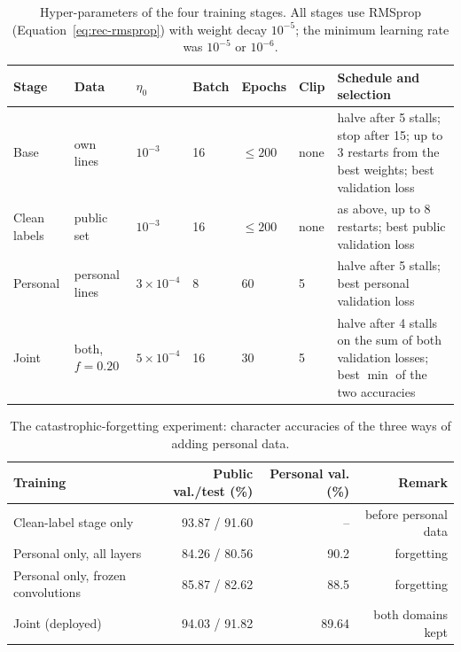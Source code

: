 \begin{table}[h]
\centering
\fontsize{9.5}{11.5}\selectfont
\begin{tabularx}{\linewidth}{|l|l|l|l|l|l|X|}
\hline
\textbf{Stage} & \textbf{Data} & \textbf{$\eta_0$} & \textbf{Batch} & \textbf{Epochs} & \textbf{Clip} & \textbf{Schedule and selection} \\
\hline
Base & own lines & $10^{-3}$ & 16 & $\le200$ & none & halve after 5 stalls; stop after 15; up to 3 restarts from the best weights; best validation loss \\
\hline
Clean labels & public set & $10^{-3}$ & 16 & $\le200$ & none & as above, up to 8 restarts; best public validation loss \\
\hline
Personal & personal lines & $3\!\times\!10^{-4}$ & 8 & 60 & 5 & halve after 5 stalls; best personal validation loss \\
\hline
Joint & both, $f=0.20$ & $5\!\times\!10^{-4}$ & 16 & 30 & 5 & halve after 4 stalls on the sum of both validation losses; best $\min$ of the two accuracies \\
\hline
\end{tabularx}
\caption{Hyper-parameters of the four training stages. All stages use RMSprop (Equation~\ref{eq:rec-rmsprop}) with weight decay $10^{-5}$; the minimum learning rate was $10^{-5}$ or $10^{-6}$.}
\label{tab:rec-stages}
\end{table}

\begin{table}[h]
\centering
\fontsize{9.5}{11.5}\selectfont
\begin{tabular}{|l|r|r|r|}
\hline
\textbf{Training} & \textbf{Public val./test (\%)} & \textbf{Personal val. (\%)} & \textbf{Remark} \\
\hline
Clean-label stage only & 93.87 / 91.60 & -- & before personal data \\
Personal only, all layers & 84.26 / 80.56 & 90.2 & forgetting \\
Personal only, frozen convolutions & 85.87 / 82.62 & 88.5 & forgetting \\
Joint (deployed) & 94.03 / 91.82 & 89.64 & both domains kept \\
\hline
\end{tabular}
\caption{The catastrophic-forgetting experiment: character accuracies of the three ways of adding personal data.}
\label{tab:rec-forget}
\end{table}

